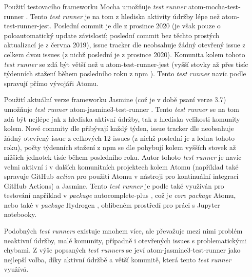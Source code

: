 Použití testovacího frameworku Mocha umožňuje \textit{test runner} atom-mocha-test-runner
\cite{test-runner-mocha-github}. Tento \textit{test runner} je na tom z hlediska aktivity údržby lépe než
atom-test-runner-jest. Poslední commit je dle \cite{test-runner-mocha-github} z prosince 2020 (je však pouze o
poloautomatický update závislostí; poslední commit bez těchto prostých aktualizací je z června 2019), issue tracker dle
\cite{test-runner-mocha-github} neobsahuje žádný otevřený issue z celkem dvou issues (z nichž poslední je z prosince
2020). Komunita kolem tohoto \textit{test runner} se zdá být větší než u atom-test-runner-jest (vyšší stovky až přes
tisíc týdenních stažení během posledního roku z npm \cite{npm}). Tento \textit{test runner} navíc podle
\cite{test-runner-mocha-github} spravují přímo vývojáři Atomu.

Použití aktuální verze frameworku Jasmine (což je v době psaní verze 3.7) umožňuje \textit{test runner}
atom-jasmine3-test-runner \cite{test-runner-jasmine3-github}. Tento \textit{test runner} se na tom zdá být nejlépe jak z
hlediska aktivní údržby, tak z hlediska velikosti komunity kolem. Nové commity dle \cite{test-runner-jasmine3-github}
přibývají každý týden, issue tracker dle \cite{test-runner-jasmine3-github} neobsahuje žádný otevřený issue z celkových
12 issues (z nichž poslední je z ledna tohoto roku), počty týdenních stažení z npm se dle \cite{npm} pohybují kolem
vyšších stovek až nižších jednotek tisíc během posledního roku. Autor tohoto \textit{test runner} je navíc velmi aktivní
i v dalších komunitních projektech kolem Atomu (například také spravuje \cite{github-action-setup-atom} GitHub
\textit{action} pro použití Atomu v nástroji pro kontinuální integraci GitHub Actions) a Jasmine. Tento
\textit{test runner} je podle \cite{test-runner-jasmine3-github} také využíván pro testování například v
\textit{package} autocomplete-plus \cite{atom-package-autocomplete-plus}, což je \textit{core package} Atomu, nebo také
v \textit{package} Hydrogen \cite{atom-package-hydrogen}, oblíbeném prostředí pro práci s Jupyter notebooky.

Podobných \textit{test runners} existuje mnohem více, ale převažuje mezi nimi problém neaktivní údržby, malé komunity,
případně i otevřených issues s problematickými chybami. Z výše popsaných \textit{test runners} se jeví
atom-jasmine3-test-runner jako nejlepší volba, díky aktivní údržbě a větší komunitě, která tento \textit{test runner}
využívá.
